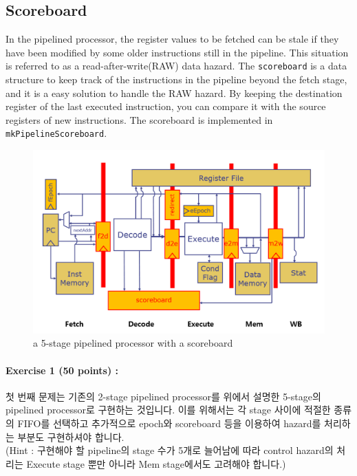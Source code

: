 \documentclass{article}
\begin{document}
\newpage
\subsection{Scoreboard}

In the pipelined processor, the register values to be fetched can be stale 
if they have been modified by some older instructions still in the pipeline.
This situation is referred to as a read-after-write(RAW) data hazard.
The \texttt{scoreboard} is a data structure to keep track of the instructions
in the pipeline beyond the fetch stage, and it is a easy solution to handle the RAW hazard.
By keeping the destination register of the last executed instruction, you can compare it
with the source registers of new instructions. The scoreboard is implemented
in \texttt{mkPipelineScoreboard}.

\begin{figure}[htbp]
	\begin{center}
		\includegraphics[scale=0.4]{5-stage.png}
		\caption{a 5-stage pipelined processor with a scoreboard}
		\label{fig:2pipe_proc}
	\end{center}
\end{figure}

\noindent \paragraph{\bf Exercise 1 (50 points) :} 첫 번째 문제는 기존의 2-stage pipelined processor를 
위에서 설명한 5-stage의 pipelined processor로 구현하는 것입니다. 이를 위해서는 각 stage 사이에 적절한 종류의 FIFO를 선택하고
추가적으로 epoch와 scoreboard 등을 이용하여 hazard를 처리하는 부분도 구현하셔야
합니다.\\
(Hint : 구현해야 할 pipeline의 stage 수가 5개로 늘어남에 따라 control hazard의
처리는 Execute stage 뿐만 아니라 Mem stage에서도 고려해야 합니다.)
\end{document}
